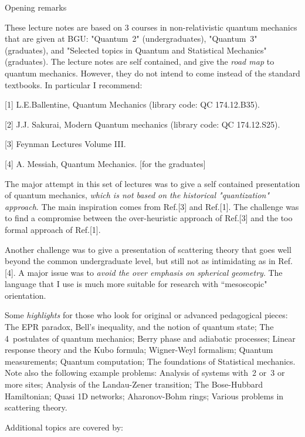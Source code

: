 \documentclass[onecolumn,fleqn, 11pt]{revtex4}
\newcommand{\Cn}[1]{\begin{center} #1 \end{center}}
\begin{document}
\newpage


\Cn{\large Opening remarks}

These lecture notes are based on 3 courses in 
non-relativistic quantum mechanics that are 
given at BGU: "Quantum~2" (undergraduates), 
"Quantum~3" (graduates), and 
"Selected topics in Quantum and Statistical Mechanics" (graduates). 
The lecture notes are self contained, 
and give the {\em road map} to quantum mechanics. 
However, they do not intend to come instead 
of the standard textbooks. In particular I recommend:

[1] L.E.Ballentine, Quantum Mechanics (library code: QC 174.12.B35).

[2] J.J. Sakurai, Modern Quantum mechanics (library code: QC 174.12.S25).

[3] Feynman Lectures Volume III.

[4] A. Messiah, Quantum Mechanics. [for the graduates]


The major attempt in this set of lectures was 
to give a self contained presentation 
of quantum mechanics, {\em which is not based 
on the historical "quantization" approach}. 
The main inspiration comes from Ref.[3] and Ref.[1].
The challenge was to find a compromise 
between the over-heuristic approach of Ref.[3] 
and the too formal approach of Ref.[1]. 

Another challenge was to give a presentation 
of scattering theory that goes well beyond the common 
undergraduate level, but still not as intimidating 
as in Ref.[4]. A major issue was to {\em avoid 
the over emphasis on spherical geometry}. 
The language that I use is much more suitable 
for research with ``mesoscopic" orientation.  


Some {\em highlights} for those who look for original 
or advanced pedagogical pieces: 
The EPR paradox, Bell's inequality, and the notion of quantum state;    
The 4~postulates of quantum mechanics; 
Berry phase and adiabatic processes; 
Linear response theory and the Kubo formula; 
Wigner-Weyl formalism; 
Quantum measurements; 
Quantum computation; 
The foundations of Statistical mechanics. 
Note also the following example problems: 
Analysis of systems with~2 or~3 or more sites;
Analysis of the Landau-Zener transition; 
The Bose-Hubbard Hamiltonian;  
Quasi 1D networks; 
Aharonov-Bohm rings; 
Various problems in scattering theory.  


Additional topics are covered by:
\end{document}
